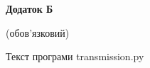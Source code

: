 \documentclass[a4paper,12pt,oneside]{article}
\begin{document}
\begin{center}
\textbf{Додаток Б}

(обов'язковий)

Текст програми transmission.py
\end{center}

\end{document}
